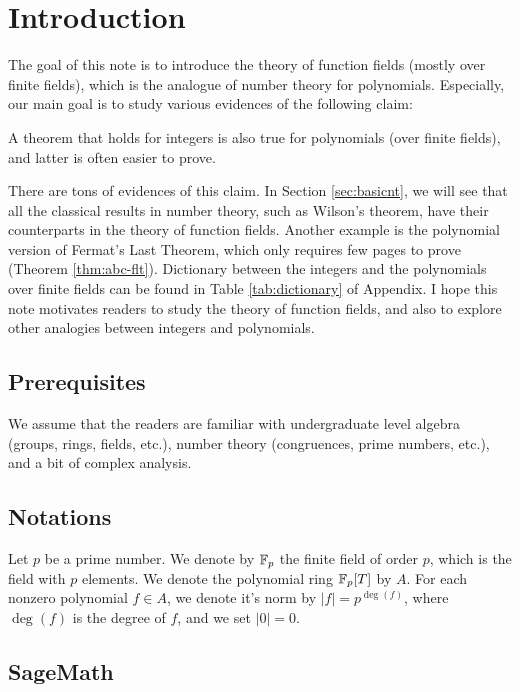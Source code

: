 \section{Introduction}
\label{sec:intro}

The goal of this note is to introduce the theory of function fields (mostly over finite fields), which is the analogue of number theory for polynomials.
Especially, our main goal is to study various evidences of the following claim:

\begin{myquote}
A theorem that holds for integers is also true for polynomials (over finite fields), and latter is often easier to prove.
\end{myquote}
There are tons of evidences of this claim.
In Section \ref{sec:basicnt}, we will see that all the classical results in number theory, such as Wilson's theorem, have their counterparts in the theory of function fields.
Another example is the polynomial version of Fermat's Last Theorem, which only requires few pages to prove (Theorem \ref{thm:abc-flt}).
Dictionary between the integers and the polynomials over finite fields can be found in Table \ref{tab:dictionary} of Appendix.
I hope this note motivates readers to study the theory of function fields, and also to explore other analogies between integers and polynomials.

\subsection{Prerequisites}
We assume that the readers are familiar with undergraduate level algebra (groups, rings, fields, etc.), number theory (congruences, prime numbers, etc.), and a bit of complex analysis.


\subsection{Notations}

Let $p$ be a prime number. We denote by $\mathbb{F}_p$ the finite field of order $p$, which is the field with $p$ elements.
We denote the polynomial ring $\mathbb{F}_p[T]$ by $A$.
For each nonzero polynomial $f \in A$, we denote it's norm by $|f| = p^{\deg (f)}$, where $\deg (f)$ is the degree of $f$, and we set $|0| = 0$.

\subsection{SageMath}

